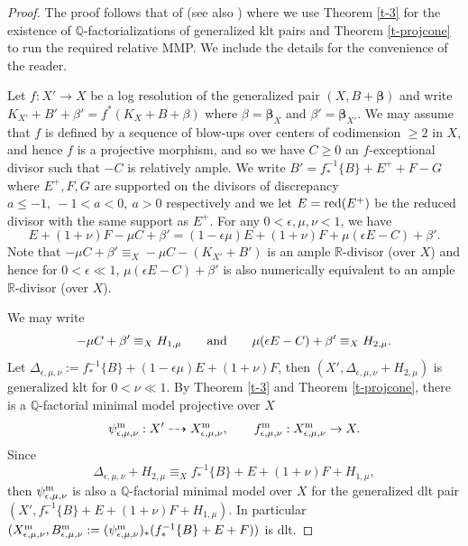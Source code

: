 \documentclass[11pt]{amsart}
\numberwithin{equation}{section}
\def\bbeta{\boldsymbol{\beta}}
\newcommand\Q{{\mathbb{Q}}}
\newcommand\R{{\mathbb{R}}}
\theoremstyle{definition}
\theoremstyle{definition}
\theoremstyle{definition}
\begin{document}
\begin{proof}
The proof follows that of \cite[Theorem 3.2]{Fil20} (see also \cite{HP24}) where we use Theorem \ref{t-3} for the existence of $\Q$-factorializations of generalized klt pairs and Theorem \ref{t-projcone} to run the required relative MMP.
We include the details for the convenience of the reader.

Let $f:X'\to X$ be a log resolution of the generalized pair $(X,B+\bbeta)$ and write $K_{X'}+B'+\beta '=f^*(K_X+B+\beta)$ where $\beta =\bbeta _X$ and $\beta '=\bbeta _{X'}$. 
We may assume that $f$ is defined by a sequence of blow-ups over centers of codimension $\geq 2$  in $X$, and hence $f$ is a projective morphism, and so we have $C\geq 0$ an $f$-exceptional divisor such that $-C$ is relatively ample.
We write $B'=f^{-1}_*\{ B\}+E^++F-G$ where $E^+,F,G$ are supported on the divisors of discrepancy $a\leq -1,\ -1<a <0,\ a >0$ respectively and we let $E={\rm red}(E^+)$ be the reduced divisor with the same support as $E^+$.
For any $0<\epsilon, \mu, \nu<1$, we have
\[E+(1+\nu)F-\mu C+\beta '=(1-\epsilon \mu)E+(1+\nu)F+\mu(\epsilon E-C)+\beta '.\]
Note that $-\mu C+\beta '\equiv _X -\mu C-(K_{X'}+B')$ is an ample $\R$-divisor (over $X$) and hence for $0<\epsilon \ll 1$,
$\mu(\epsilon E-C)+\beta '$ is also numerically equivalent to an ample $\R$-divisor (over $X$). 

 We may write \[-\mu C+\beta '\equiv _X H_{1,\mu}\qquad  {\rm and}\qquad
\mu(\epsilon E-C)+\beta '\equiv _X H_{2,\mu}.\] Let $\Delta_{\epsilon, \mu,\nu}:=f^{-1}_*\{ B\}+(1-\epsilon \mu)E+(1+\nu)F$, then $(X',\Delta_{\epsilon, \mu,\nu}+H_{2,\mu})$ is generalized klt  for $0< \nu \ll 1$.
By Theorem \ref{t-3} and  Theorem \ref{t-projcone}, there is a $\Q$-factorial minimal model projective over $X$
\[\psi^{\rm m}_{\epsilon, \mu,\nu}:X'\dasharrow X^{\rm m}_{\epsilon, \mu,\nu},\qquad  f^{\rm m}_{\epsilon, \mu,\nu}:X^{\rm m}_{\epsilon, \mu,\nu}\to X.\]
Since \[\Delta_{\epsilon, \mu,\nu}+H_{2,\mu }\equiv _Xf^{-1}_*\{ B\}+E+(1+\nu)F+H_{1,\mu },\]
then $\psi^{\rm m}_{\epsilon, \mu,\nu}$ is also a $\Q$-factorial minimal model over $X$
for the generalized dlt pair $(X', f^{-1}_*\{ B\}+E+(1+\nu)F+H_{1,\mu })$. In particular $(X^{\rm m}_{\epsilon, \mu,\nu}, B^{\rm m}_{\epsilon, \mu,\nu}:= (\psi^{\rm m}_{\epsilon, \mu,\nu})_*(f^{-1}_*\{ B\}+E+F))$ is dlt.


\end{proof}
\end{document}
